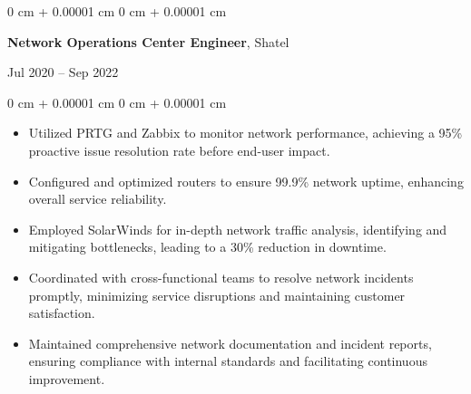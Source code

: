 \documentclass[10pt, letterpaper]{article}
\newenvironment{highlights}{
    \begin{itemize}[
        topsep=0.10 cm,
        parsep=0.10 cm,
        partopsep=0pt,
        itemsep=0pt,
        leftmargin=0 cm + 10pt
    ]
}{
    \end{itemize}
} %
\newenvironment{onecolentry}{
    \begin{adjustwidth}{
        0 cm + 0.00001 cm
    }{
        0 cm + 0.00001 cm
    }
}{
    \end{adjustwidth}
} %
\newenvironment{twocolentry}[2][]{
    \onecolentry
    \def\secondColumn{#2}
    \setcolumnwidth{\fill, 4.5 cm}
    \begin{paracol}{2}
}{
    \switchcolumn \raggedleft \secondColumn
    \end{paracol}
    \endonecolentry
} %
\begin{document}
                \vspace{0.2 cm}

                \begin{twocolentry}{Jul 2020 -- Sep 2022}
                    \textbf{Network Operations Center Engineer}, Shatel
                \end{twocolentry}
                \vspace{0.10 cm}
                \begin{onecolentry}
                    \begin{highlights}
                        \item Utilized PRTG and Zabbix to monitor network performance, achieving a 95\% proactive issue resolution rate before end-user impact.
                        \item Configured and optimized routers to ensure 99.9\% network uptime, enhancing overall service reliability.
                        \item Employed SolarWinds for in-depth network traffic analysis, identifying and mitigating bottlenecks, leading to a 30\% reduction in downtime.
                        \item Coordinated with cross-functional teams to resolve network incidents promptly, minimizing service disruptions and maintaining customer satisfaction.
                        \item Maintained comprehensive network documentation and incident reports, ensuring compliance with internal standards and facilitating continuous improvement.
                    \end{highlights}
                \end{onecolentry}

                \vspace{0.2 cm}
\end{document}
